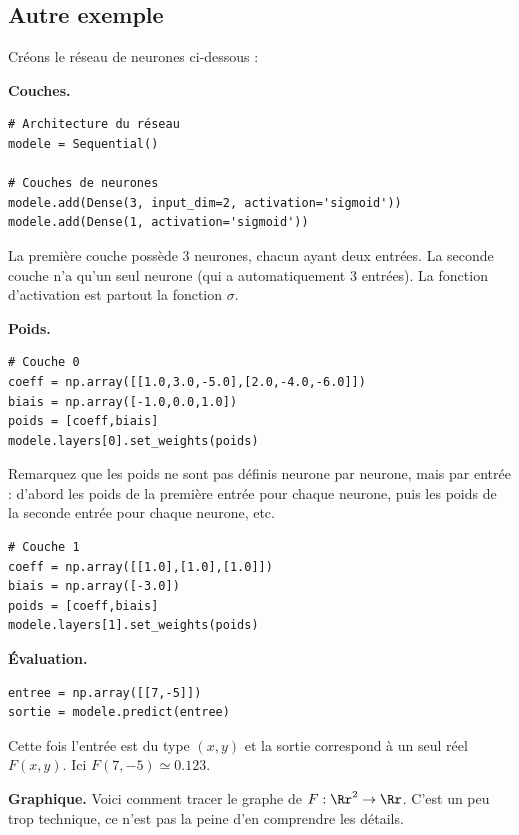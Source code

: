 \documentclass[11pt,class=report,crop=false]{standalone}
\begin{document}
\subsection{Autre exemple}

Créons le réseau de neurones ci-dessous :



\textbf{Couches.}
\begin{lstlisting}
# Architecture du réseau
modele = Sequential()

# Couches de neurones
modele.add(Dense(3, input_dim=2, activation='sigmoid'))
modele.add(Dense(1, activation='sigmoid'))
\end{lstlisting}

La première couche possède $3$ neurones, chacun ayant deux entrées.
La seconde couche n'a qu'un seul neurone (qui a automatiquement $3$ entrées). La fonction d'activation est partout la fonction $\sigma$.

\bigskip
\textbf{Poids.}


\begin{lstlisting}
# Couche 0
coeff = np.array([[1.0,3.0,-5.0],[2.0,-4.0,-6.0]])
biais = np.array([-1.0,0.0,1.0])
poids = [coeff,biais]
modele.layers[0].set_weights(poids)
\end{lstlisting}

Remarquez que les poids ne sont pas définis neurone par neurone, mais par entrée : d'abord les poids de la première entrée pour chaque neurone, puis les poids de la seconde entrée pour chaque neurone, etc.

\begin{lstlisting}
# Couche 1
coeff = np.array([[1.0],[1.0],[1.0]])
biais = np.array([-3.0])
poids = [coeff,biais]
modele.layers[1].set_weights(poids)
\end{lstlisting}

\bigskip
\textbf{Évaluation.}
\begin{lstlisting}
entree = np.array([[7,-5]])
sortie = modele.predict(entree)
\end{lstlisting}

Cette fois l'entrée est du type $(x,y)$ et la sortie correspond à un seul réel $F(x,y)$. Ici $F(7,-5) \simeq 0.123$.

\bigskip
\textbf{Graphique.}
Voici comment tracer le graphe de $F: \Rr^2 \to \Rr$. C'est un peu trop technique, ce n'est pas la peine d'en comprendre les détails.
\end{document}
